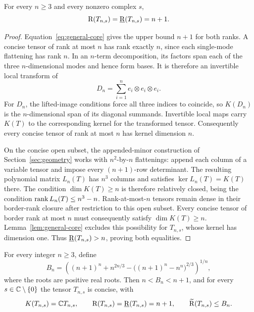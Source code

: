 \begin{lemma}\label{lem:general-core-rank}
For every $n\geq3$ and every nonzero complex $s$,
\begin{equation}\label{eq:general-core-ranks}
 \mathrm R(T_{n,s})=\underline{\mathrm R}(T_{n,s})=n+1.
\end{equation}
\end{lemma}

\begin{proof}
Equation~\eqref{eq:general-core} gives the upper bound $n+1$ for
both ranks. A concise tensor of rank at most $n$ has rank exactly
$n$, since each single-mode flattening has rank $n$. In an
$n$-term decomposition, its factors span each of the three
$n$-dimensional modes and hence form bases. It is therefore an
invertible local transform of
\[
 D_n=\sum_{i=1}^n e_i\otimes e_i\otimes e_i.
\]
For $D_n$, the lifted-image conditions force all three indices to
coincide, so $K(D_n)$ is the $n$-dimensional span of its diagonal
summands. Invertible local maps carry $K(T)$ to the corresponding
kernel for the transformed tensor. Consequently every concise
tensor of rank at most $n$ has kernel dimension $n$.

On the concise open subset, the appended-minor construction of
Section~\ref{sec:geometry} works with $n^2$-by-$n$ flattenings:
append each column of a variable tensor and impose every
$(n+1)$-row determinant. The resulting polynomial matrix $L_n(T)$
has $n^3$ columns and satisfies $\ker L_n(T)=K(T)$ there.
The condition $\dim K(T)\geq n$ is therefore relatively closed,
being the condition $\operatorname{rank} L_n(T)\leq n^3-n$.
Rank-at-most-$n$ tensors remain dense in their border-rank closure
after restriction to this open subset. Every concise tensor of
border rank at most $n$ must consequently satisfy
$\dim K(T)\geq n$. Lemma~\ref{lem:general-core} excludes this
possibility for $T_{n,s}$, whose kernel has dimension one.
Thus $\underline{\mathrm R}(T_{n,s})>n$, proving both equalities.
\end{proof}

\begin{proposition}\label{prop:components-core}
For every integer $n\geq3$, define
\begin{equation}\label{eq:components-Bn}
 B_n=\left((n+1)^n+n^{2n/3}
            -\bigl((n+1)^n-n^n\bigr)^{2/3}\right)^{1/n},
\end{equation}
where the roots are positive real roots. Then $n<B_n<n+1$, and
for every $s\in\mathbb C\setminus\{0\}$ the tensor $T_{n,s}$ is concise,
with
\[
 K(T_{n,s})=\mathbb C T_{n,s},\qquad
 \mathrm R(T_{n,s})=\underline{\mathrm R}(T_{n,s})=n+1,\qquad
 \widetilde{\mathrm R}(T_{n,s})\leq B_n.
\]
\end{proposition}

